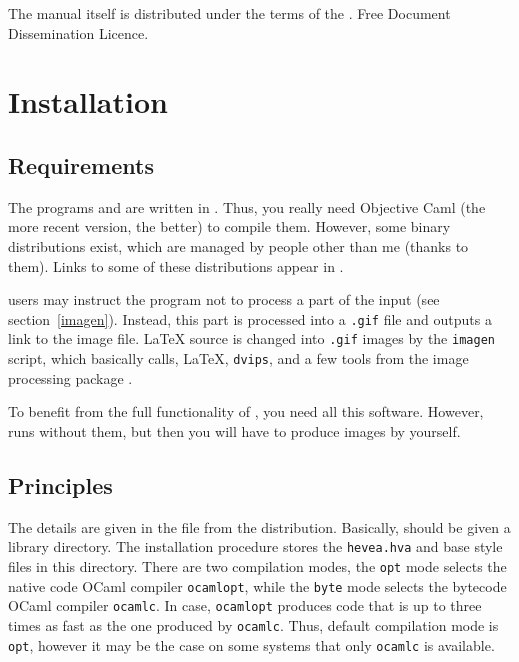 The manual itself is distributed under the terms of
the
\ifhevea
{}.
\else
{}
{Free Document Dissemination Licence}.
\fi

\section{Installation}

\subsection{Requirements}\label{requirements}
The programs  and  are written in
. Thus, you
really need Objective Caml (the more recent version, the better) to
compile them.
However, some binary distributions exist, which are managed by
people other than me (thanks to them).
Links to some of these distributions appear in .

\label{imagen:needs}\hevea{} users may instruct the program not to process a
part of the input (see section~\ref{imagen}). Instead, this part is
processed into a 
\verb+.gif+ file and \hevea{} outputs a  link to the image file.
\LaTeX{} source is changed into \verb+.gif+ images by the \verb+imagen+
script, which basically calls, \LaTeX, \texttt{dvips},
and a few tools from the image processing package
.

To benefit from the full functionality of \hevea, you need all
this software. However, \hevea{} runs without them, but then you will
have to produce images by yourself.

\subsection{Principles}
The details are given in the 
file from the distribution.
Basically, \hevea{} should be given a library
directory. The installation procedure stores the \texttt{hevea.hva}
and base style files in this directory.
There are two compilation modes, the \texttt{opt} mode selects the
native code  OCaml compiler \texttt{ocamlopt}, while the \texttt{byte}
mode selects the bytecode  OCaml compiler \texttt{ocamlc}.
In \hevea{} case, \texttt{ocamlopt} produces code that is up to three
times as fast as the one produced by \texttt{ocamlc}.
Thus, default compilation mode is \texttt{opt}, however it may be the
case on some systems that only \texttt{ocamlc} is available.

